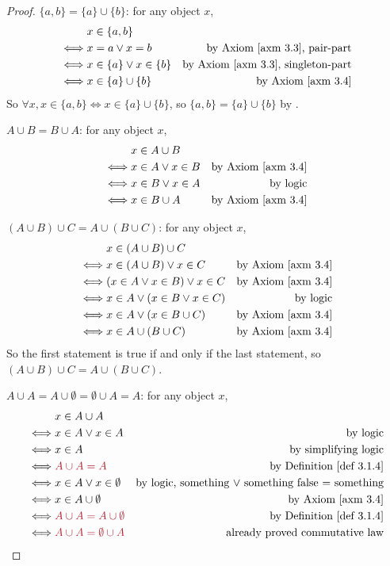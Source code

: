 \begin{proof}
\( \{a, b\} = \{ a \} \cup \{ b \} \): for any object \(x\),
\begin{align*}
         & x \in \{a, b\} \\
    \iff & x = a \lor x = b & \text{by \AXM{3.3}, pair-part} \\
    \iff & x \in \{a\} \lor x \in \{b\} & \text{by \AXM{3.3}, singleton-part} \\
    \iff & x \in \{a\} \cup \{b\} & \text{by \AXM{3.4}} \\
\end{align*}
So \(\forall x, x \in \{a, b\} \iff x \in \{a\} \cup \{b\} \), so \(\{a, b\} = \{a\} \cup \{b\} \) by .

\(A \cup B = B \cup A\): for any object \(x\),
\begin{align*}
         & x \in A \cup B \\
    \iff & x \in A \lor x \in B & \text{by \AXM{3.4}} \\
    \iff & x \in B \lor x \in A & \text{by logic} \\
    \iff & x \in B \cup A & \text{by \AXM{3.4}}
\end{align*}

\((A \cup B) \cup C = A \cup (B \cup C)\): for any object \(x\),
\begin{align*}
         & x \in (A \cup B) \cup C \\
         \iff & x \in (A \cup B) \lor x \in C & \text{by \AXM{3.4}} \\
         \iff & (x \in A \lor x \in B) \lor x \in C & \text{by \AXM{3.4}} \\
         \iff & x \in A \lor (x \in B \lor x \in C) & \text{by logic} \\
         \iff & x \in A \lor (x \in B \cup C) & \text{by \AXM{3.4}} \\
         \iff & x \in A \cup (B \cup C) & \text{by \AXM{3.4}} \\
\end{align*}
So the first statement is true if and only if the last statement, so \((A \cup B) \cup C = A \cup (B \cup C)\).

\(A \cup A = A \cup \emptyset = \emptyset \cup A = A\): for any object \(x\),
\begin{align*}
         & x \in A \cup A \\
    \iff & x \in A \lor x \in A & \text{by logic} \\
    \iff & x \in A & \text{by simplifying logic} \\
    \iff & \MAROON{A \cup A = A} & \text{by \DEF{3.1.4}} \\
    \iff & x \in A \lor x \in \emptyset & \text{by logic, something \(\lor\) something false = something} \\
    \iff & x \in A \cup \emptyset & \text{by \AXM{3.4}} \\
    \iff & \MAROON{A \cup A = A \cup \emptyset} & \text{by \DEF{3.1.4}} \\
    \iff & \MAROON{A \cup A = \emptyset \cup A} & \text{already proved commutative law}
\end{align*}
\end{proof}

